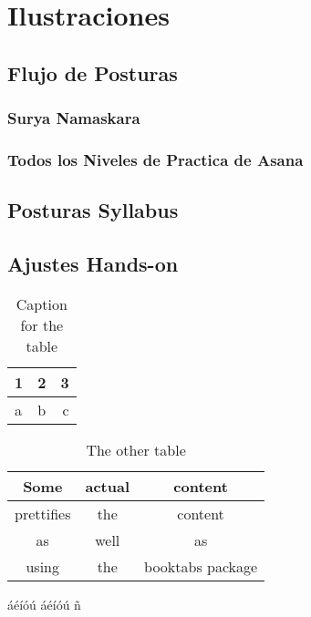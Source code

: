 \chapter{Ilustraciones}
\section{Flujo de Posturas}
\subsection{Surya Namaskara}
\subsection{Todos los Niveles de Practica de Asana}
\section{Posturas Syllabus}
\section{Ajustes Hands-on}



\begin{table}[h!]
	\centering
	\begin{tabular}{l|c||r}
		1 & 2 & 3\\
		\hline
		a & b & c\\
	\end{tabular}
	\caption{Caption for the table}
	\label{tab:table}
\end{table}


\begin{table}[h!]
	\centering
	\begin{tabular}{ccc}
		\toprule
		Some & actual & content\\
		\midrule
		prettifies & the & content\\
		as & well & as \\
		using & the & booktabs package\\
		\bottomrule
	\end{tabular}
	\caption{The other table}
	\label{tab:table2}
\end{table}


\newpage
áéíóú
\'a\'e\'i\'o\'u
ñ

